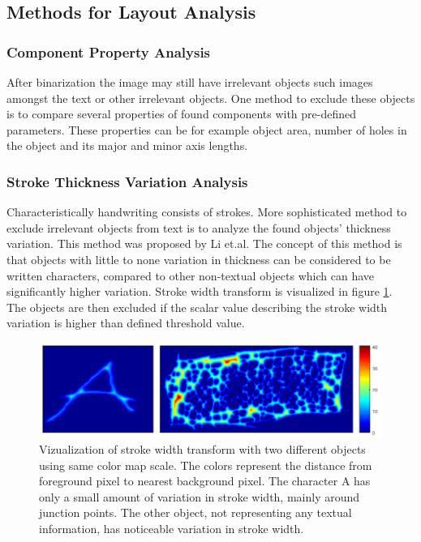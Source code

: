 \documentclass{article}
\begin{document}
      \subsection{Methods for Layout Analysis}

        \subsubsection{Component Property Analysis}
          After binarization the image may still have irrelevant objects such images amongst the text or other irrelevant objects. One method to exclude these objects is to compare several properties of found components with pre-defined parameters. These properties can be for example object area, number of holes in the object and its major and minor axis lengths.

        \subsubsection{Stroke Thickness Variation Analysis}
          Characteristically handwriting consists of strokes. More sophisticated method to exclude irrelevant objects from text is to analyze the found objects' thickness variation. This method was proposed by Li et.al. \cite{Li} The concept of this method is that objects with little to none variation in thickness can be considered to be written characters, compared to other non-textual objects which can have significantly higher variation. Stroke width transform is visualized in figure \ref{fig:strokewidth}. The objects are then excluded if the scalar value describing the stroke width variation is higher than defined threshold value.

          \begin{figure}
            \centering
            \includegraphics[natwidth=863,natheight=239,scale=0.5]{strokecomparison.png}
            \caption{Vizualization of stroke width transform with two different objects using same color map scale. The colors represent the distance from foreground pixel to nearest background pixel. The character A has only a small amount of variation in stroke width, mainly around junction points. The other object, not representing any textual information, has noticeable variation in stroke width. \label{fig:strokewidth} }
          \end{figure}
\end{document}
